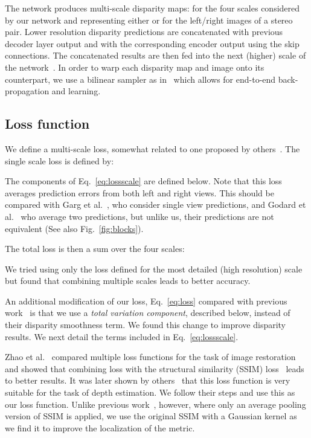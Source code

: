 \documentclass[10pt,twocolumn,letterpaper]{article}
\newcommand{\minisection}[1]{\vspace{1mm}\noindent{\textbf{#1}}}
\begin{document}
The network produces multi-scale disparity maps:  for the four scales considered by our network and  representing either  or  for the left/right images of a stereo pair. Lower resolution disparity predictions are concatenated with previous decoder layer output and with the corresponding encoder output using the skip connections. The concatenated results are then fed into the next (higher) scale of the network~\cite{MIFDB16}. In order to warp each disparity map and image onto its counterpart, we use a bilinear sampler as in~\cite{jaderberg2015spatial} which allows for end-to-end back-propagation and learning.

\subsection{Loss function}\label{sec:loss}
We define a multi-scale loss, somewhat related to one proposed by others~\cite{monodepth17}. The single scale loss is defined by:

The components of Eq.~\eqref{eq:lossscale} are defined below. Note that this loss averages prediction errors from both left and right views. This should be compared with Garg et al.~\cite{garg2016unsupervised}, who consider single view predictions, and Godard et al.~\cite{monodepth17} who average two predictions, but unlike us, their predictions are not equivalent (See also Fig.~\ref{fig:blocks}).

The total loss is then a sum over the four scales:

We tried using only the loss defined for the most detailed (high resolution) scale but found that combining multiple scales leads to better accuracy.

An additional modification of our loss, Eq.~\eqref{eq:loss} compared with previous work~\cite{monodepth17} is that we use a {\em total variation component}, described below, instead of their disparity smoothness term. We found this change to improve disparity results. We next detail the terms included in Eq.~\eqref{eq:lossscale}.

\minisection{Image loss.} Zhao et al.~\cite{zhao2017loss} compared multiple loss functions for the task of image restoration and showed that combining  loss with the structural similarity (SSIM) loss~\cite{wang2004image} leads to better results. It was later shown by others~\cite{monodepth17,geonet} that this loss function is very suitable for the task of depth estimation. We follow their steps and use this as our loss function. Unlike previous work~\cite{monodepth17}, however, where only an average pooling version of SSIM is applied, we use the original SSIM with a Gaussian kernel as we find it to improve the localization of the metric.
\end{document}
